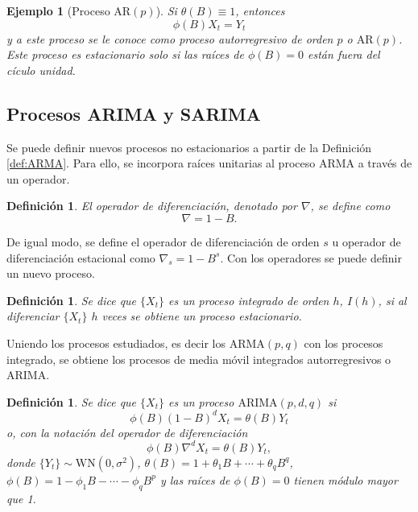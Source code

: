 \documentclass[12pt,twoside]{article}
\newtheorem{definition}[theorem]{Definición}
\newtheorem{example}[theorem]{Ejemplo}
\newcommand{\ar}{\text{AR}}
\newcommand{\arma}{\text{ARMA}}
\newcommand{\arima}{\text{ARIMA}}
\newcommand{\wn}{\text{WN}(0, \sigma^2)}
\begin{document}
\begin{example}[Proceso $\ar(p)$] Si $\theta(B)\equiv1$, entonces
\begin{equation}\label{eq:ar_process}
    \phi(B)X_t = Y_t
\end{equation}
y a este proceso se le conoce como proceso autorregresivo de orden $p$ o $\ar(p)$. Este proceso es estacionario solo si las raíces de $\phi(B) = 0$ están fuera del cículo unidad.
\end{example}

\subsection{Procesos ARIMA y SARIMA}
Se puede definir nuevos procesos no estacionarios a partir de la Definición \ref{def:ARMA}. Para ello, se incorpora raíces unitarias al proceso ARMA a través de un operador.


\begin{definition}
    El operador de diferenciación, denotado por $\nabla$, se define como
    \begin{equation*}
        \nabla = 1 -B.
    \end{equation*}
\end{definition}

De igual modo, se define el operador de diferenciación de orden $s$ u operador de diferenciación estacional como $\nabla_s = 1 - B^s$. Con los operadores se puede definir un nuevo proceso.

\begin{definition}
    Se dice que $\{X_t\}$ es un proceso integrado de orden $h$, $I(h)$, si al diferenciar $\{X_t\}$ $h$ veces se obtiene un proceso estacionario.
\end{definition}

Uniendo los procesos estudiados, es decir los $\arma(p,q)$ con los procesos integrado, se obtiene los procesos de media móvil integrados autorregresivos o ARIMA.

\begin{definition}
    Se dice que $\{X_t\}$ es un proceso $\arima(p,d,q)$ si
    \begin{equation}\label{eq:ARIMA}
        \phi(B)(1-B)^d X_t = \theta(B) Y_t
    \end{equation}
    o, con la notación del operador de diferenciación
        \begin{equation}\label{eq:ARIMA2}
        \phi(B)\nabla^d X_t = \theta(B) Y_t,
    \end{equation}
    donde $\{Y_t\} \sim \wn$, $\theta(B) = 1 + \theta_1B + \dotsb + \theta_qB^q$, $\phi(B) = 1 - \phi_1B - \dotsb - \phi_qB^p$ y las raíces de $\phi(B) = 0$ tienen módulo mayor que 1.
\end{definition}
\end{document}
